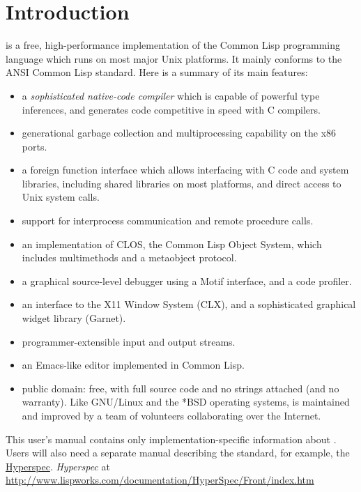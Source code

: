 \chapter{Introduction}

\cmucl{} is a free, high-performance implementation of the Common Lisp
programming language which runs on most major Unix platforms. It
mainly conforms to the ANSI Common Lisp standard. Here is a summary of
its main features:

\begin{itemize}
\item a {\em sophisticated native-code compiler} which is capable of
powerful type inferences, and generates code competitive in speed with
C compilers.

\item generational garbage collection and multiprocessing
capability on the x86 ports.

\item a foreign function interface which allows interfacing with C code and
system libraries, including shared libraries on most platforms, and
direct access to Unix system calls.

\item support for interprocess communication and remote procedure
calls.
     
\item an implementation of CLOS, the Common Lisp Object System, which
includes multimethods and a metaobject protocol.

\item a graphical source-level debugger using a Motif interface, and a
code profiler.

\item an interface to the X11 Window System (CLX), and a sophisticated
graphical widget library (Garnet).

\item programmer-extensible input and output streams.
                        
\item an Emacs-like editor implemented in Common Lisp.

\item public domain: free, with full source code and no
strings attached (and no warranty).  Like GNU/Linux and the *BSD
operating systems, \cmucl{} is maintained and improved by a team of
volunteers collaborating over the Internet.
\end{itemize}


This user's manual contains only implementation-specific information
about \cmucl. Users will also need a separate manual describing the
\clisp{} standard, for example, the
\ifpdf
\href{http://www.lispworks.com/documentation/HyperSpec/Front/index.htm}
{Hyperspec}.
\else
\emph{Hyperspec} at \url{http://www.lispworks.com/documentation/HyperSpec/Front/index.htm}
\fi


